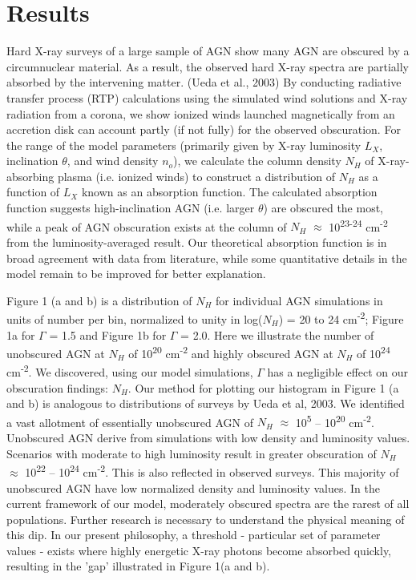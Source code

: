 \documentclass[12pt,linenumbers]{aastex631}
\begin{document}
\section{Results} \label{sec:style}

	Hard X-ray surveys of a large sample of AGN show many AGN are obscured by a circumnuclear material.  As a result, the observed hard X-ray spectra are partially absorbed by the intervening matter. (Ueda et al., 2003) By conducting radiative transfer process (RTP) calculations using the simulated wind solutions and X-ray radiation from a corona, we show ionized winds launched magnetically from an accretion disk can account partly (if not fully) for the observed obscuration.  For the range of the model parameters (primarily given by X-ray luminosity $L_X$, inclination $\theta$, and wind density $n_o$), we calculate the column density $N_H$ of X-ray-absorbing plasma (i.e.  ionized winds) to construct a distribution of $N_H$ as a function of $L_X$ known as an absorption function.  The calculated absorption function suggests high-inclination AGN (i.e.  larger $\theta$) are obscured the most, while a peak of AGN obscuration exists at the column of $N_H$  $\approx$ 10\textsuperscript{23-24}  cm\textsuperscript{-2} from the luminosity-averaged result.  Our theoretical absorption function is in broad agreement with data from literature, while some quantitative details in the model remain to be improved for better explanation.\par
	Figure 1 (a and b) is a distribution of $N_H$ for individual AGN simulations in units of number per bin, normalized to unity in log($N_H$) = 20 to 24 cm\textsuperscript{-2}; Figure 1a for $\Gamma$ = 1.5 and Figure 1b for $\Gamma$ = 2.0.  Here we illustrate the number of unobscured AGN at $N_H$ of 10\textsuperscript{20} cm\textsuperscript{-2} and highly obscured AGN at $N_H$ of 10\textsuperscript{24} cm\textsuperscript{-2}.  We discovered, using our model simulations, $\Gamma$ has a negligible effect on our obscuration findings: $N_H$.  Our method for plotting our histogram in Figure 1 (a and b) is analogous to distributions of surveys by Ueda et al, 2003.  We identified a vast allotment of essentially unobscured AGN of $N_H$ $\approx$ 10\textsuperscript{5} – 10\textsuperscript{20} cm\textsuperscript{-2}.  Unobscured AGN derive from simulations with low density and luminosity values.  Scenarios with moderate to high luminosity result in greater obscuration of $N_H$ $\approx$ 10\textsuperscript{22} – 10\textsuperscript{24} cm\textsuperscript{-2}.  This is also reflected in observed surveys.  This majority of unobscured AGN have low normalized density and luminosity values.  In the current framework of our model, moderately obscured spectra are the rarest of all populations.  Further research is necessary to understand the physical meaning of this dip.  In our present philosophy, a threshold - particular set of parameter values - exists where highly energetic X-ray photons become absorbed quickly, resulting in the 'gap' illustrated in Figure 1(a and b).  \par
\end{document}
